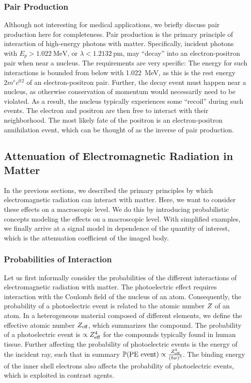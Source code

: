 \documentclass[../ml-tct.tex]{subfiles}
\begin{document}
\subsubsection{Pair Production}
Although not interesting for medical applications, we briefly discuss pair production here for completeness.
Pair production is the primary principle of interaction of high-energy photons with matter.
Specifically, incident photons with \( E_p > \SI{1.022}{\mega\electronvolt} \), or \( \lambda < \SI{1.2132}{\pico\meter} \), may \enquote{decay} into an electron-positron pair when near a nucleus.
The requirements are very specific:
The energy for such interactions is bounded from below with \SI{1.022}{\mega\electronvolt}, as this is the rest energy \( 2 \si{\electronmass\clight^2} \) of an electron-positron pair.
Further, the decay event must happen near a nucleus, as otherwise conservation of momentum would necessarily need to be violated.
As a result, the nucleus typically experiences some \enquote{recoil} during such events.
The electron and positron are then free to interact with their neighborhood.
The most likely fate of the positron is an electron-positron annihilation event, which can be thought of as the inverse of pair production.
\subsection{Attenuation of Electromagnetic Radiation in Matter}
In the previous sections, we described the primary principles by which electromagnetic radiation can interact with matter.
Here, we want to consider these effects on a macroscopic level.
We do this by introducing probabilistic concepts modeling the effects on a macroscopic level.
With simplified examples, we finally arrive at a signal model in dependence of the quantity of interest, which is the attenuation coefficient of the imaged body.

\subsubsection{Probabilities of Interaction}
Let us first informally consider the probabilities of the different interactions of electromagnetic radiation with matter.
The photoelectric effect requires interaction with the Coulomb field of the nucleus of an atom.
Consequently, the probability of a photoelectric event is related to the atomic number \( Z \) of an atom.
In a heterogeneous material composed of different elements, we define the effective atomic number \( Z_\text{eff} \), which summarizes the compound.
The probability of a photoelectric event is \( \propto Z_\text{eff}^4 \) for the compounds typically found in human tissue.
Further affecting the probability of photoelectric events is the energy of the incident ray, such that in summary \( \mathbb{P}(\text{PE event}) \propto \frac{Z_\text{eff}^4}{{(h\nu)}^3} \).
The binding energy of the inner shell electrons also affects the probability of photoelectric events, which is exploited in contrast agents.
\end{document}
